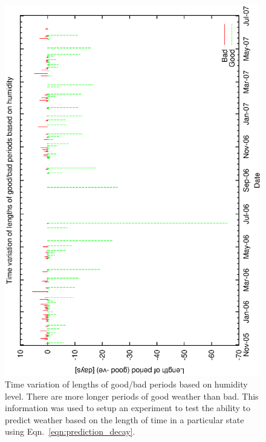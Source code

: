 {\begin{figure}[htbp]
\begin{center}
    \includegraphics[scale=0.4, angle=-90]{figures/ecs/gbc_period.eps}
\end{center}
\caption[Time variation of lengths of good/bad periods based on humidity level.]
{Time variation of lengths of good/bad periods based on humidity level. There are more longer periods of good weather than bad. This information was used to setup an experiment to test the ability to predict weather based on the length of time in a particular state using Eqn.~\ref{eqn:prediction_decay}.}
\label{fig:good_bad_period_time}
\end{figure}

}
